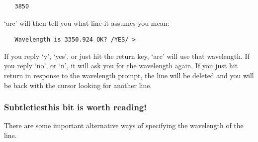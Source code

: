 \begin{verbatim}
   3850
\end{verbatim}

   `arc' will then tell you what line it assumes you mean:

\begin{verbatim}
   Wavelength is 3350.924 OK? /YES/ >
\end{verbatim}

   If you reply `y', `yes', or just hit the return key, `arc' will use
   that wavelength.  If you reply `no', or `n', it will ask you for the
   wavelength again.  If you just hit return in response to the
   wavelength prompt, the line will be deleted and you will be back with
   the cursor looking for another line.


\subsubsection{\label{techno10subtle}Subtleties\latorhtm{---}{-}this bit is
   worth reading!}

   There are some important alternative ways of specifying the
   wavelength of the line.

